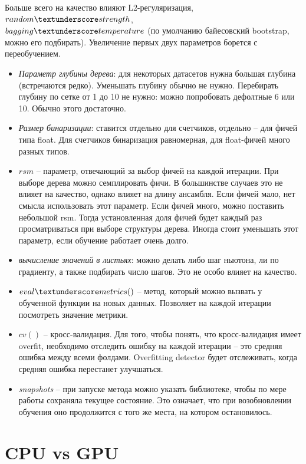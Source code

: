 \documentclass[a4paper,12pt]{article}
\begin{document}
Больше всего на качество влияют L2-регуляризация, $random \textunderscore strength$, \\
$bagging \textunderscore temperature$ (по умолчанию байесовский bootstrap, можно его подбирать). Увеличение первых двух параметров борется с переобучением. 

\begin{itemize}[noitemsep]
\item \textit{Параметр глубины дерева}: для некоторых датасетов нужна большая глубина (встречаются редко). Уменьшать глубину обычно не нужно. Перебирать глубину по сетке от 1 до 10 не нужно: можно попробовать дефолтные 6 или 10. Обычно этого достаточно.
\item \textit{Размер бинаризации}: ставится отдельно для счетчиков, отдельно – для фичей типа float. Для счетчиков бинаризация равномерная, для float-фичей много разных типов. 
\item $rsm$ – параметр, отвечающий за выбор фичей на каждой итерации. При выборе дерева можно семплировать фичи. В большинстве случаев это не влияет на качество, однако влияет на длину ансамбля. Если фичей мало, нет смысла использовать этот параметр. Если фичей много, можно поставить небольшой rsm. Тогда установленная доля фичей будет каждый раз просматриваться при выборе структуры дерева. Иногда стоит уменьшать этот параметр, если обучение работает очень долго. 
\item \textit{вычисление значений в листьях}: можно делать либо шаг ньютона, ли по градиенту, а также подбирать число шагов. Это не особо влияет на качество.
\item $eval\textunderscore metrics()$ – метод, который можно вызвать у обученной функции на новых данных. Позволяет на каждой итерации посмотреть значение метрики. 
\item $cv()$ – кросс-валидация. Для того, чтобы понять, что кросс-валидация имеет overfit, необходимо отследить ошибку на каждой итерации – это средняя ошибка между всеми фолдами. Overfitting detector будет отслеживать, когда средняя ошибка перестанет улучшаться. 
\item \textit{snapshots} – при запуске метода можно указать библиотеке, чтобы по мере работы сохраняла текущее состояние. Это означает, что при возобновлении обучения оно продолжится с того же места, на котором остановилось.
\end{itemize}

\section{CPU vs GPU}
\end{document}
